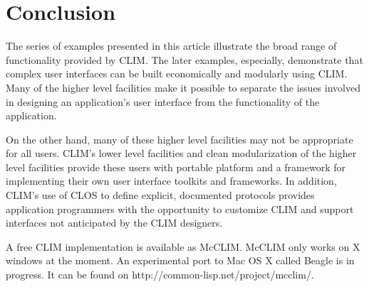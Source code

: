 \documentclass[twocolumn,a4paper]{article}
\newcommand {\code}[1]{{\sffamily #1}}
\newcommand {\CLIM}{{\small CLIM}}
\let\method\code
\let\constant\code
\begin{document}
% 

\section{Conclusion}

The series of examples presented in this article illustrate the broad
range of functionality provided by \CLIM{}. The later examples,
especially, demonstrate that complex user interfaces can be built
economically and modularly using \CLIM{}. Many of the higher level
facilities make it possible to separate the issues involved in
designing an application's user interface from the functionality of
the application.

On the other hand, many of these higher level facilities may not be
appropriate for all users. \CLIM{}'s lower level facilities and clean
modularization of the higher level facilities provide these users with
portable platform and a framework for implementing their own user
interface toolkits and frameworks. In addition, \CLIM{}'s use of CLOS
to define explicit, documented protocols provides application
programmers with the opportunity to customize \CLIM{} and support
interfaces not anticipated by the \CLIM{} designers.

A free \CLIM{} implementation is available as McCLIM. McCLIM only
works on X windows at the moment. An experimental port to Mac OS X
called Beagle is in progress. It can be found on
http://common-lisp.net/project/mcclim/.
\end{document}
